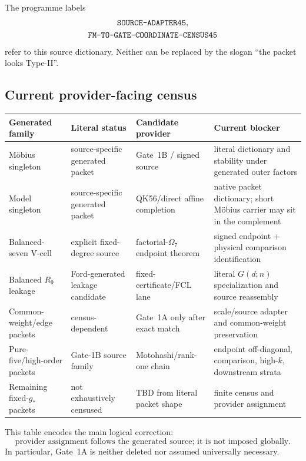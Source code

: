 \documentclass[11pt]{article}
\theoremstyle{definition}
\newcommand{\1}{\mathbf 1}
\begin{document}
The programme labels
\[
\begin{gathered}
\text{\ttfamily SOURCE-ADAPTER45},\\
\text{\ttfamily FM-TO-GATE-COORDINATE-CENSUS45}
\end{gathered}
\]
refer to this source dictionary.  Neither can be replaced by the slogan ``the packet looks
Type-II''.

\subsection{Current provider-facing census}

\begin{center}
\renewcommand{\arraystretch}{1.18}
\begin{tabularx}{\textwidth}{>{\raggedright\arraybackslash}p{}
>{\raggedright\arraybackslash}p{}
>{\raggedright\arraybackslash}p{}X}
\toprule
Generated family & Literal status & Candidate provider & Current blocker\\
\midrule
M\"obius singleton & source-specific generated packet &
Gate~1B / signed source &
literal dictionary and stability under generated outer factors\\
Model singleton & source-specific generated packet &
QK56/direct affine completion &
native packet dictionary; short M\"obius carrier may sit in the complement\\
Balanced-seven V-cell & explicit fixed-degree source &
factorial-$\Omega_7$ endpoint theorem &
signed endpoint + physical comparison identification\\
Balanced $R_9$ leakage & Ford-generated leakage candidate &
fixed-certificate/FCL lane &
literal $G(d;n)$ specialization and source reassembly\\
Common-weight/edge packets & census-dependent &
Gate~1A only after exact match &
scale/source adapter and common-weight preservation\\
Pure-five/high-order packets & Gate-1B source family &
Motohashi/rank-one chain &
endpoint off-diagonal, comparison, high-$k$, downstream strata\\
Remaining fixed-$g_\ast$ packets & not exhaustively censused &
TBD from literal packet shape &
finite census and provider assignment\\
\bottomrule
\end{tabularx}
\end{center}

This table encodes the main logical correction:
\[
\boxed{
\text{provider assignment follows the generated source; it is not imposed globally.}
}
\]
In particular, Gate~1A is neither deleted nor assumed universally necessary.
\end{document}
